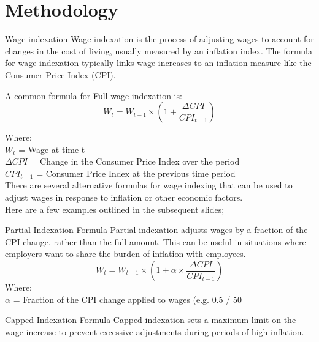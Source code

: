 \documentclass{beamer}
\begin{document}
{\section{Methodology}
\begin{frame}{Wage indexation}
Wage indexation is the process of adjusting wages to account for changes in the cost of living, usually measured by an inflation index. The formula for wage indexation typically links wage increases to an inflation measure like the Consumer Price Index (CPI).\\ 
 \begin{exampleblock}{A common formula for Full wage indexation is:}
\begin{equation}
 W_t = W_{t-1} \times \left(1 + \frac{\Delta CPI}{CPI_{t-1}}\right)
\label{eqn:full indexation} 
\end{equation}
\end{exampleblock}
Where: \\
$ W_t$ = Wage at time t  \\
$ \Delta CPI$  = Change in the Consumer Price Index over the period \\
$ CPI_{t-1}$  = Consumer Price Index at the previous time period \\
There are several alternative formulas for wage indexing that can be used to adjust wages in response to inflation or other economic factors. \\
Here are a few examples outlined in the subsequent slides;
\end{frame}
\begin{frame}
\begin{block}{Partial Indexation Formula}
Partial indexation adjusts wages by a fraction of the CPI change, rather than the full amount. This can be useful in situations where employers want to share the burden of inflation with employees. \\
\begin{equation}
 W_t = W_{t-1} \times \left(1 + \alpha \times \frac{\Delta CPI}{CPI_{t-1}}\right)
\end{equation}
Where: \\
$\alpha$ = Fraction of the CPI change applied to wages (e.g. 0.5 / 50%
    \end{block}
    \begin{exampleblock}{Capped Indexation Formula}
Capped indexation sets a maximum limit on the wage increase to prevent excessive adjustments during periods of high inflation. \\
\begin{equation}

\end{equation}
\end{exampleblock}
\end{frame}}
\end{document}
